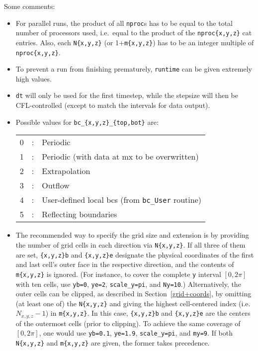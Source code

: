 \noindent
Some comments:
\begin{itemize}
\item For parallel runs, the product of all {\tt nproc}s has to be
  equal to the total number of processors used, i.e.\ equal to
  the product of the {\tt nproc\{x,y,z\}} cat entries.
  Also, each {\tt N\{x,y,z\}} (or 1+{\tt m\{x,y,z\}}) has to be an
  integer multiple of {\tt nproc\{x,y,z\}}.
\item To prevent a run from finishing prematurely, {\tt runtime}
  can be given extremely high values.
\item {\tt dt} will only be used for the first timestep, while the
  stepsize will then be CFL-controlled (except to match the intervals
  for data output).
\item Possible values for {\tt bc\_\{x,y,z\}\_\{top,bot\}} are:
  \begin{center}
    \begin{tabular}{rcl}
      0  &:&  Periodic \\
      1  &:&  Periodic (with data at mx to be overwritten) \\
      2  &:&  Extrapolation \\
      3  &:&  Outflow \\
      4  &:&  User-defined local bcs (from {\tt bc\_User} routine) \\
      5  &:&  Reflecting boundaries \\
    \end{tabular}
  \end{center}
\item The recommended way to specify the grid size and extension is by
  providing the number of grid cells in each direction via {\tt N\{x,y,z\}}.
  If all three of them are set, {\tt \{x,y,z\}b} and {\tt \{x,y,z\}e}
  designate the physical coordinates of the first and last cell's outer face
  in the respective direction, and the contents of {\tt m\{x,y,z\}} is ignored.
  (For instance, to cover the complete {\tt y} interval $[0,2\pi]$ with ten
  cells, use {\tt yb=0}, {\tt ye=2}, {\tt scale\_y=pi}, and {\tt Ny=10}.)
  Alternatively, the outer cells can be clipped, as described in
  Section~\ref{grid+coords}, by omitting (at least one of) the
  {\tt N\{x,y,z\}} and giving the highest cell-centered index (i.e.\
  $N_{x,y,z}-1$) in {\tt m\{x,y,z\}}. In this case, {\tt \{x,y,z\}b} and
  {\tt \{x,y,z\}e} are the centers of the outermost cells (prior to clipping).
  To achieve the same coverage of $[0,2\pi]$, one would use {\tt yb=0.1},
  {\tt ye=1.9}, {\tt scale\_y=pi}, and {\tt my=9}. If both {\tt N\{x,y,z\}}
  and {\tt m\{x,y,z\}} are given, the former takes precedence.
\end{itemize}


